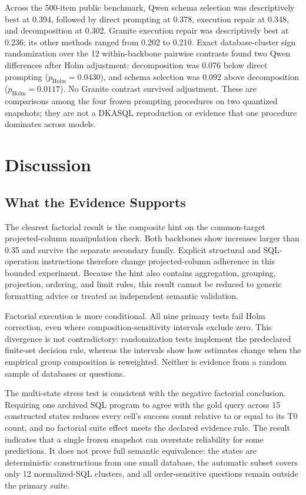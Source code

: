\documentclass[applsci,article,submit,moreauthors]{Definitions/mdpi}
\begin{document}
Across the 500-item public benchmark, Qwen schema selection was descriptively best at 0.394, followed by direct prompting at 0.378, execution repair at 0.348, and decomposition at 0.302. Granite execution repair was descriptively best at 0.236; its other methods ranged from 0.202 to 0.210. Exact database-cluster sign randomization over the 12 within-backbone pairwise contrasts found two Qwen differences after Holm adjustment: decomposition was 0.076 below direct prompting ($p_{\mathrm{Holm}}=0.0430$), and schema selection was 0.092 above decomposition ($p_{\mathrm{Holm}}=0.0117$). No Granite contrast survived adjustment. These are comparisons among the four frozen prompting procedures on two quantized snapshots; they are not a DKASQL reproduction or evidence that one procedure dominates across models.

\section{Discussion}
\subsection{What the Evidence Supports}
The clearest factorial result is the composite hint on the common-target projected-column manipulation check. Both backbones show increases larger than 0.35 and survive the separate secondary family. Explicit structural and SQL-operation instructions therefore change projected-column adherence in this bounded experiment. Because the hint also contains aggregation, grouping, projection, ordering, and limit rules, this result cannot be reduced to generic formatting advice or treated as independent semantic validation.

Factorial execution is more conditional. All nine primary tests fail Holm correction, even where composition-sensitivity intervals exclude zero. This divergence is not contradictory: randomization tests implement the predeclared finite-set decision rule, whereas the intervals show how estimates change when the empirical group composition is reweighted. Neither is evidence from a random sample of databases or questions.

The multi-state stress test is consistent with the negative factorial conclusion. Requiring one archived SQL program to agree with the gold query across 15 constructed states reduces every cell's success count relative to or equal to its T0 count, and no factorial suite effect meets the declared evidence rule. The result indicates that a single frozen snapshot can overstate reliability for some predictions. It does not prove full semantic equivalence: the states are deterministic constructions from one small database, the automatic subset covers only 12 normalized-SQL clusters, and all order-sensitive questions remain outside the primary suite.
\end{document}

